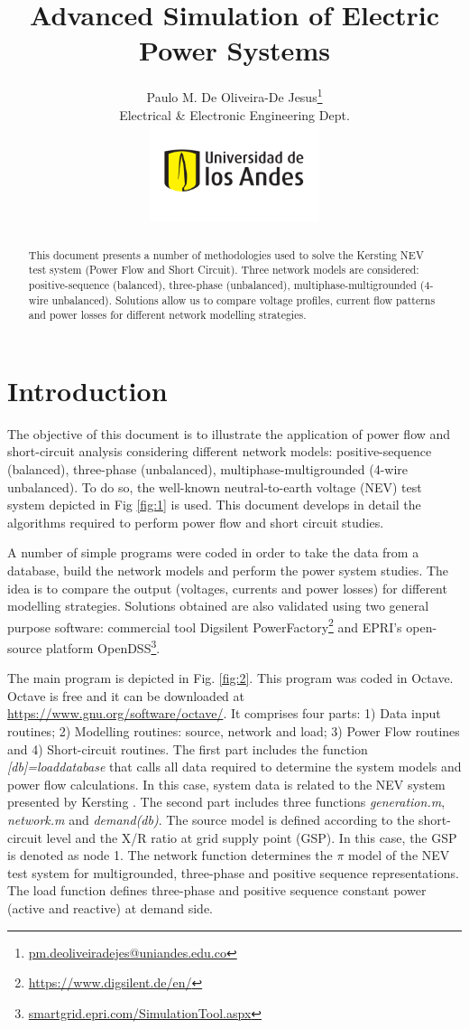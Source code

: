 \documentclass[12pt]{article}
\title{Advanced Simulation of Electric \\ Power Systems}
\author{Paulo M. De Oliveira-De Jesus\thanks{\url{pm.deoliveiradejes@uniandes.edu.co}} \\
Electrical \& Electronic Engineering Dept.\\
 \includegraphics[width=5cm]{imagenes/logo}}
\begin{document}
\maketitle
\begin{abstract}
This document presents a number of methodologies used to solve the Kersting NEV test system (Power Flow and Short Circuit).
Three network models are considered: positive-sequence (balanced), three-phase (unbalanced), multiphase-multigrounded (4-wire unbalanced).  Solutions allow us to compare voltage profiles, current flow patterns and power losses for different network modelling strategies.
\end{abstract}


\section{Introduction}
\setcounter{equation}{0}

The objective of this document is to illustrate the application of power flow and short-circuit analysis considering different network models:  positive-sequence (balanced), three-phase (unbalanced), multiphase-multigrounded (4-wire unbalanced). To do so, the well-known neutral-to-earth voltage (NEV) test system depicted in Fig \ref{fig:1} is used. This document develops in detail the algorithms required to perform power flow and short circuit studies.

A number of simple programs were coded in order to take the data from a database, build the network models and perform the power system studies. The idea is to compare the output (voltages, currents and power losses) for different modelling strategies. Solutions obtained are also validated using two general purpose software: commercial tool Digsilent PowerFactory\footnote{\url{https://www.digsilent.de/en/}} and EPRI's open-source platform OpenDSS\footnote{\url{smartgrid.epri.com/SimulationTool.aspx}}.

The main program is depicted in Fig. \ref{fig:2}. This program was coded in Octave. Octave is free and it can be downloaded at \url{https://www.gnu.org/software/octave/}. It comprises four parts: 1) Data input routines;
  2) Modelling routines: source, network and load; 3) Power Flow routines and 4) Short-circuit routines.
The first part includes the function {\em [db]=loaddatabase} that calls all data required to determine the system models and power flow calculations. In this case, system data is related to the NEV system presented by Kersting \cite{1}. The second part includes three functions  {\em generation.m},  {\em network.m} and  {\em demand(db)}. The source model is defined according to the short-circuit level and the X/R ratio at grid supply point (GSP). In this case, the GSP is denoted as node 1. The network function determines the $\pi$ model of the NEV test system for multigrounded, three-phase and positive sequence representations. The load function defines three-phase and positive sequence constant power (active and reactive) at demand side.
\end{document}
